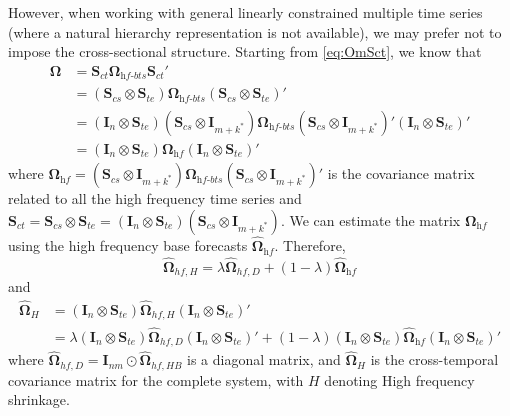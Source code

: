 \documentclass[a4paper,11pt]{article}
\newcommand{\Ivet}{\bm{I}}
\newcommand{\Svet}{\bm{S}}
\newcommand{\Omegavet}{\bm{\Omega}}
\theoremstyle{definition}
\begin{document}
However, when working with general linearly constrained multiple time series (where a natural hierarchy representation is not available), we may prefer not to impose the cross-sectional structure. Starting from \eqref{eq:OmSct}, we know that
\begin{align*}
	\Omegavet & = \Svet_{ct}\Omegavet_{\textit{hf-bts}}\Svet_{ct}'                                                                                                                                                            \\
	          & = \left(\Svet_{cs} \otimes \Svet_{te}\right)\Omegavet_{\textit{hf-bts}}\left(\Svet_{cs} \otimes \Svet_{te}\right)'                                                                                            \\
	          & = \left(\Ivet_n \otimes \Svet_{te}\right)\left(\Svet_{cs} \otimes \Ivet_{m+k^\ast}\right)\Omegavet_{\textit{hf-bts}}\left(\Svet_{cs} \otimes \Ivet_{m+k^\ast}\right)'\left(\Ivet_n \otimes \Svet_{te}\right)' \\
	          & = \left(\Ivet_n \otimes \Svet_{te}\right)\Omegavet_{\textit{hf}}\left(\Ivet_n \otimes \Svet_{te}\right)'
\end{align*}
where $\Omegavet_{\textit{hf}} = \left(\Svet_{cs} \otimes \Ivet_{m+k^\ast}\right)\Omegavet_{\textit{hf-bts}}\left(\Svet_{cs} \otimes \Ivet_{m+k^\ast}\right)'$ is the covariance matrix related to all the high frequency time series and $\Svet_{ct} = \Svet_{cs} \otimes \Svet_{te} = \left(\Ivet_n \otimes \Svet_{te}\right)\left(\Svet_{cs} \otimes \Ivet_{m+k^\ast}\right)$. We can estimate the matrix $\Omegavet_{\textit{hf}}$ using the high frequency base forecasts $\widehat{\Omegavet}_{\textit{hf}}$. Therefore,
$$
	\widehat{\Omegavet}_{hf, H} = \lambda \widehat{\Omegavet}_{hf, D} + (1-\lambda) \widehat{\Omegavet}_{\textit{hf}}
$$
and
\begin{align*}
	\widehat{\Omegavet}_{H} & = (\Ivet_{n} \otimes \Svet_{te})\widehat{\Omegavet}_{hf, H} (\Ivet_{n} \otimes \Svet_{te})'                                                                                                            \\
	                        & = \lambda (\Ivet_{n} \otimes \Svet_{te})\widehat{\Omegavet}_{hf, D}(\Ivet_{n} \otimes \Svet_{te})' + (1-\lambda) (\Ivet_{n} \otimes \Svet_{te})\widehat{\Omegavet}_{\textit{hf}}(\Ivet_{n} \otimes \Svet_{te})'
\end{align*}
where $\widehat{\Omegavet}_{hf, D} = \Ivet_{nm}\odot\widehat{\Omegavet}_{hf, HB}$ is a diagonal matrix, and $\widehat{\Omegavet}_{H}$ is the cross-temporal covariance matrix for the complete system, with $H$ denoting High frequency shrinkage.
\end{document}
